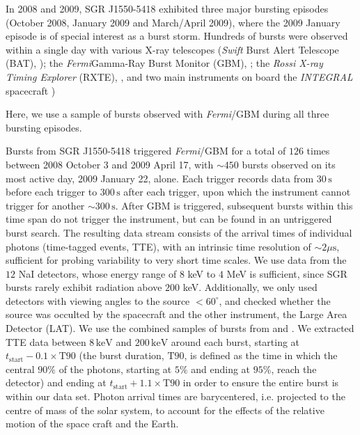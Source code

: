 \documentclass[12pt]{emulateapj}
\newcommand{\project}[1]{\textsl{#1}}
\newcommand{\fermi}{\project{Fermi}}
\begin{document}
In 2008 and 2009, SGR J1550-5418 exhibited three major bursting episodes (October 2008, January 2009 and March/April 2009), where the 2009 January episode is of special interest as a
burst storm. Hundreds of bursts were observed within a single day with various X-ray telescopes ({\it Swift} Burst Alert Telescope (BAT), \citealp{israel2010, scholz2011}); the \fermi Gamma-Ray Burst Monitor (GBM), \citealp{kaneko2010,vonkienlin2012,vanderhorst2012}; the {\it Rossi X-ray Timing Explorer} (RXTE), \citep{dib2012}, and two main instruments on board the {\it INTEGRAL} spacecraft \citealp{mereghetti2009, savchenko2010})
 
Here, we use a sample of bursts observed with {\it Fermi}/GBM during all three bursting episodes. 

Bursts from SGR J1550-5418 triggered \fermi/GBM for a total of $126$ times between 2008 October 3 and 2009 April 17, with $\sim 450$ bursts observed on its most active day, 2009 January 22, alone. 
Each trigger records data from $30\,\mathrm{s}$ before each trigger to $300\,\mathrm{s}$ after each trigger, upon which the instrument cannot trigger for another $\sim 300 \,\mathrm{s}$. 
After GBM is triggered, subsequent bursts within this time span do not trigger the instrument, but can be found in an untriggered burst search. The resulting data stream consists of 
the arrival times of individual photons (time-tagged events, TTE), with an intrinsic time resolution of $\sim 2\mu\mathrm{s}$, sufficient for probing variability to very short time scales.
We use data from the $12$ NaI detectors, whose energy range of $8$ keV to $4$ MeV is sufficient, since SGR bursts rarely exhibit radiation above $200$ keV. Additionally, we only used detectors with viewing angles to the source $< 60^{\circ}$, and checked whether the source was occulted by the spacecraft and the other instrument, the Large Area Detector (LAT). We use the combined samples of bursts from \citet{vonkienlin2012} and \citet{vanderhorst2012}. 
We extracted TTE data between $8 \, \mathrm{keV}$ and $200 \, \mathrm{keV}$ around each burst, starting at $t_{\mathrm{start}} - 0.1 \times\mathrm{T}90$ (the burst duration, $\mathrm{T}90$, is defined as the time in which the central $90\%$ of the photons, starting at $5\%$ and ending at $95\%$, reach the detector) and ending at $t_{\mathrm{start}} + 1.1\times\mathrm{T}90$ in order to ensure the entire burst is within our data set. Photon arrival times are barycentered, i.e. projected to the centre of mass of the solar system, to account for the effects of the relative motion of the space craft and the Earth.
\end{document}
